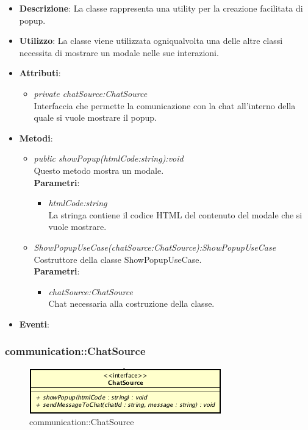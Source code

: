 \begin{itemize}
\item \textbf{Descrizione}: La classe rappresenta una utility per la creazione facilitata di popup.
\item \textbf{Utilizzo}: La classe viene utilizzata ogniqualvolta una delle altre classi necessita di mostrare un modale nelle sue interazioni.
\item \textbf{Attributi}: 
	\begin{itemize}
	\item \textit{private chatSource:ChatSource}\\
	Interfaccia che permette la comunicazione con la chat all'interno della quale si vuole mostrare il popup.
	\end{itemize}
\item \textbf{Metodi}:
	\begin{itemize}
	\item \textit{public showPopup(htmlCode:string):void}\\
	Questo metodo mostra un modale.
			\\ \textbf{Parametri}: \begin{itemize}
			\item \textit{htmlCode:string}\\
			La stringa contiene il codice HTML del contenuto del modale che si vuole mostrare.
			\end{itemize} 
	\item \textit{ShowPopupUseCase(chatSource:ChatSource):ShowPopupUseCase}\\
	Costruttore della classe ShowPopupUseCase.
		\\\textbf{Parametri}: \begin{itemize}
		\item \textit{chatSource:ChatSource}\\
		Chat necessaria alla costruzione della classe.
		\end{itemize} 
	\end{itemize}
\item \textbf{Eventi}:
\end{itemize}

\subsubsection{communication::ChatSource}

\label{communication::ChatSource}
\begin{figure}[H]
	\centering
	\includegraphics[scale=0.5]{Sezioni/SottosezioniST/img/app/ChatSource.png}
	\caption{communication::ChatSource}
\end{figure}

